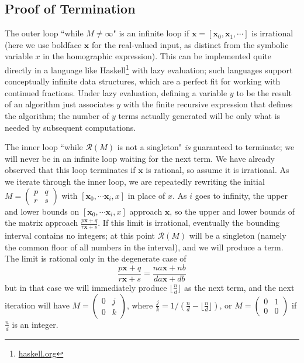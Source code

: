 \documentclass[11pt, oneside]{amsart}   	%
\newcommand{\pqrs}{\left(
\begin{smallmatrix} 
p & q\\ 
r & s 
\end{smallmatrix}
\right)}
\begin{document}
\subsection{Proof of Termination}
The outer loop ``while $M \neq \infty$" is an infinite loop if $\mathbf{x} = [\mathbf{x}_0, \mathbf{x}_1,\cdots]$ is irrational
(here we use boldface $\mathbf{x}$ for the real-valued input, as distinct from the symbolic variable $x$ in the homographic
expression). This can be implemented quite directly in a language like Haskell\footnote{\href{https://haskell.org}{haskell.org}} with
lazy evaluation; such languages support conceptually infinite data structures, which are a perfect fit for working with continued
fractions. Under lazy evaluation, defining a variable $y$ to be the result of an algorithm just associates $y$ with the finite recursive
expression that defines the algorithm; the number of $y$ terms actually generated will be only what is needed by subsequent computations.

The inner loop ``while $\mathcal{R}(M)$ is not a singleton" \emph{is} guaranteed to terminate; we will never be in an infinite loop
waiting for the next term. We have already observed that this loop terminates if $\mathbf{x}$ is rational, so assume it is irrational. As
we iterate through the inner loop, we are repeatedly rewriting the initial $M = \pqrs$
with $[\mathbf{x}_0, \cdots \mathbf{x}_i, x]$ in place of $x$. As $i$ goes to infinity, the upper and lower bounds on
$[\mathbf{x}_0, \cdots \mathbf{x}_i, x]$ approach $\mathbf{x}$, so the upper and lower bounds of the matrix approach
$\frac{p\mathbf{x}+q}{r\mathbf{x}+s}$.
If this limit is irrational, eventually the bounding interval contains no integers; at this point $\mathcal{R}(M)$  will be a singleton
(namely the common floor of all numbers in the interval), and we will produce a term. The limit is rational only in the degenerate case
of
\[
\frac{p\mathbf{x}+q}{r\mathbf{x}+s} = \frac{na\mathbf{x}+nb}{da\mathbf{x}+db}
\]
but in that case we will immediately produce $\lfloor \frac{n}{d} \rfloor$ as the next term,
and the next iteration will have $M =\left(
\begin{smallmatrix} 
0 & j\\ 
0 & k 
\end{smallmatrix}
\right)$, where $\frac{j}{k} = 1/(\frac{n}{d}  -\lfloor \frac{n}{d} \rfloor)$, or $M = \left(\begin{smallmatrix}0 & 1 \\ 0 & 0\end{smallmatrix}\right)$ if $\frac{n}{d}$ is an integer.
\end{document}
